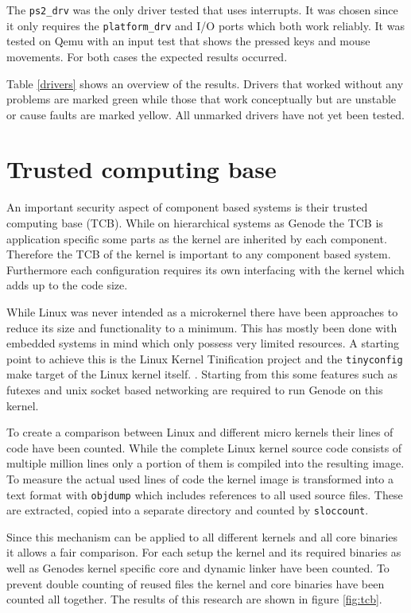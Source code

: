 \documentclass[
a4paper,
11pt,
twoside
]{report}
\begin{document}
		The \texttt{ps2\_drv} was the only driver tested that uses interrupts.
		It was chosen since it only requires the \texttt{platform\_drv} and I/O ports which both work reliably.
		It was tested on Qemu with an input test that shows the pressed keys and mouse movements.
		For both cases the expected results occurred.
		
		Table \ref{drivers} shows an overview of the results.
		Drivers that worked without any problems are marked green while those that work conceptually but are unstable or cause faults are marked yellow.
		All unmarked drivers have not yet been tested.
		
		\section{Trusted computing base}
		
		An important security aspect of component based systems is their trusted computing base (TCB).
		While on hierarchical systems as Genode the TCB is application specific some parts as the kernel are inherited by each component.
		Therefore the TCB of the kernel is important to any component based system.
		Furthermore each configuration requires its own interfacing with the kernel which adds up to the code size.
		
		While Linux was never intended as a microkernel there have been approaches to reduce its size and functionality to a minimum.
		This has mostly been done with embedded systems in mind which only possess very limited resources.
		A starting point to achieve this is the Linux Kernel Tinification project and the \texttt{tinyconfig} make target of the Linux kernel itself. \citep{tiny}.
		Starting from this some features such as futexes and unix socket based networking are required to run Genode on this kernel.
		
		To create a comparison between Linux and different micro kernels their lines of code have been counted.
		While the complete Linux kernel source code consists of multiple million lines only a portion of them is compiled into the resulting image.
		To measure the actual used lines of code the kernel image is transformed into a text format with \texttt{objdump}\citep{objdump} which includes references to all used source files.
		These are extracted, copied into a separate directory and counted by \texttt{sloccount}\citep{sloccount}.
		
		Since this mechanism can be applied to all different kernels and all core binaries it allows a fair comparison.
		For each setup the kernel and its required binaries as well as Genodes kernel specific core and dynamic linker have been counted.
		To prevent double counting of reused files the kernel and core binaries have been counted all together.
		The results of this research are shown in figure \ref{fig:tcb}.
		
\end{document}
